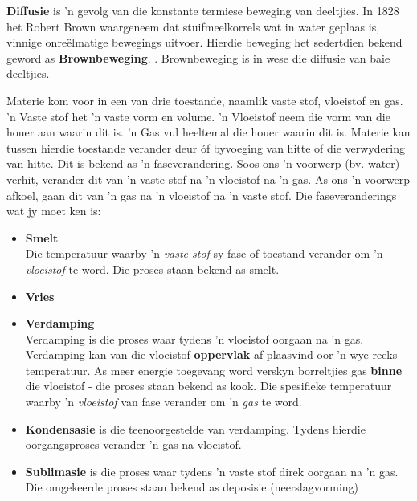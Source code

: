 \par 
\label{m38736*id10987324}\textbf{Diffusie} is  'n gevolg van die konstante termiese beweging van deeltjies. In 1828 het Robert Brown waargeneem dat stuifmeelkorrels wat in water geplaas is, vinnige onreëlmatige bewegings uitvoer. Hierdie beweging het sedertdien bekend geword as \textbf{Brownbeweging}. . Brownbeweging is in wese die diffusie van baie deeltjies.
\par 
\label{m38736*id48327}Materie kom voor in een van drie toestande, naamlik vaste stof, vloeistof en gas.  'n Vaste stof het  'n vaste vorm en volume.  'n Vloeistof neem die vorm van die houer aan waarin dit is.  'n Gas vul heeltemal die houer waarin dit is. Materie kan tussen hierdie toestande verander deur óf byvoeging van hitte of die verwydering van hitte. Dit is bekend as  'n faseverandering. Soos ons  'n voorwerp (bv. water) verhit, verander dit van  'n vaste stof na  'n vloeistof na  'n gas. As ons  'n voorwerp afkoel, gaan dit van  'n gas na  'n vloeistof na  'n vaste stof. Die faseveranderings wat jy moet ken is:
\label{m38736*id02341}\begin{itemize}[noitemsep]
\item \textbf{Smelt} \\ 
 { \label{m38734*meaningfhsst!!!underscore!!!id276}
Die temperatuur waarby  'n \textsl{vaste stof} sy fase of toestand verander om  'n \textsl{vloeistof} te word. Die proses staan bekend as smelt. } 
\item \textbf{Vries} \\
\item \textbf{Verdamping} \\
Verdamping is die proses waar tydens  'n vloeistof oorgaan na  'n gas. Verdamping kan van die vloeistof \textbf{oppervlak} af plaasvind oor  'n wye reeks temperatuur. As meer energie toegevang word verskyn borreltjies gas \textbf{binne} die vloeistof - die proses staan bekend as kook.
 { \label{m38734*meaningfhsst!!!underscore!!!id282}
Die spesifieke temperatuur waarby  'n \textsl{vloeistof} van fase verander om  'n \textsl{gas} te word.} 
\item \textbf{Kondensasie} is die teenoorgestelde van verdamping. Tydens hierdie oorgangsproses verander  'n gas na vloeistof.
\item \textbf{Sublimasie} is die proses waar tydens  'n vaste stof direk oorgaan na  'n gas. Die omgekeerde proses staan bekend as deposisie (neerslagvorming)\end{itemize}

